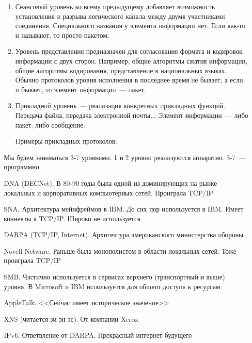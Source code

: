 \begin{enumerate}
\item Сеансовый уровень ко всему предыдущему добавляет возможность установления и разрыва логического канала между двумя участниками соединения. Специального названия у элемента информации нет. Если как-то и называют, то просто пакетом.

\item Уровень представления предназначен для согласования формата и кодировок информации с двух сторон. Например, общие алгоритмы сжатия информации, общие алгоритмы кодирования, представление в национальных языках. Обычно протоколов уровня исполнения в последнее время не бывает, а если и бывает, то элемент информации~--- пакет.

\item Прикладной уровень~--- реализация конкретных прикладных функций. Передача файла, передача электронной почты... Элемент информации~--- либо пакет, либо сообщение.

Примеры прикладных протоколов:

\end{enumerate}

Мы будем заниматься 3-7 уровнями. 1 и 2 уровни реализуются аппаратно. 3-7~--- программно.


\begin{MyItemize}
    \item DNA (DECNet). В 80-90 годы была одной из доминирующих на рынке локальных и корпоративных компьютерных сетей. Проиграла TCP/IP
    \item SNA. Архитектура мейнфреймов в IBM. До сих пор используется в IBM. Имеет коннекты к TCP/IP. Широко не используется.
    \item DARPA (TCP/IP, Internet). Архитектура американского министерства обороны. 
    \item Novell Netware. Раньше была монополистом в области локальных сетей. Тоже проиграла TCP/IP
    \item SMB. Частично используется в сервисах верхнего (транспортный и выше) уровня. В Microsoft и IBM используется для общего доступа к ресурсам
    \item AppleTalk. <<Сейчас имеет историческое значение>>
    \item XNS (читается зи эн эс). От компании Xerox
    \item IPv6. Ответвление от DARPA. Прекрасный интернет будущего
\end{MyItemize}

